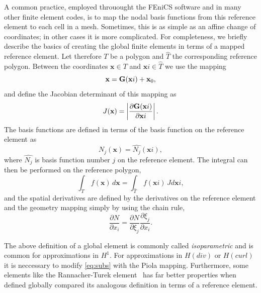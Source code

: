 A common practice, employed throuought the FEniCS
software and in many other finite element codes, is to map the nodal
basis functions from this reference element to each cell in a mesh.
Sometimes, this is as simple as an affine change of coordinates; in
other cases it is more complicated.
For completeness, we briefly describe the basics of creating the global finite elements in terms of a mapped
reference element. Let therefore $T$ be a polygon and $\hat{T}$ the corresponding reference polygon.
Between the coordinates
$\mathbf{x}\in T$ and $\mathbf{x}i\in\hat T$ we use the mapping
\begin{equation}
\label{eq:geometry}
\mathbf{x} = \mathbf{G}(\mathbf{x}i) + \mathbf{x}_0,
\end{equation}
and define the Jacobian determinant of this mapping as
\begin{equation}
\label{eq:geometry2}
J(\mathbf{x}) = \left| \frac{\partial\mathbf{G}(\mathbf{x}i) }{\partial \mathbf{x}i} \right| .
\end{equation}
The basis functions are defined in terms of the basis function
on the reference element as
\begin{equation}
\label{eq:subs}
N_j(\mathbf{x}) = \hat{N_j}(\mathbf{x}i),
\end{equation}
where $\hat{N_j}$ is basis function number $j$ on the reference element.
The integral can then be performed on the reference polygon,
\begin{equation}
\label{eq:integration2}
\int_T \, f(\mathbf{x}) \, d\mathbf{x} = \int_{\hat{T}} \, f(\mathbf{x}i) \, J d\mathbf{x}i ,
\end{equation}
and the spatial derivatives are defined by the derivatives on the
reference element and the geometry mapping simply by using the
chain rule,
\begin{equation}
\label{eq:chain}
\frac{\partial N}{\partial x_i} =
\frac{\partial N}{\partial \xi_j} \frac{\partial \xi_j }{\partial x_i }  .
\end{equation}

The above definition of a global element is commonly called \emph{isoparametric}
and is common for approximations in $H^1$. For approximations in $H(div)$ or
$H(curl)$ it is neccessary to modify \eqref{eq:subs} with the Piola mapping.
Furthermore, some elements like the Rannacher-Turek element~\cite{Turek99,RannacherTurek92} has far better
properties when defined globally compared its analogous definition in terms
of a reference element.



